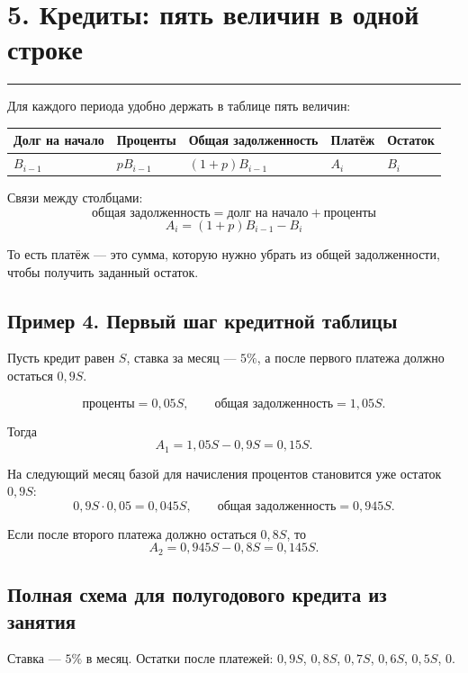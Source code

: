 \documentclass[a4paper,12pt]{article}
\newcommand{\sectionline}{\vspace{-0.4em}\textcolor{linegray}{\rule{\linewidth}{0.5pt}}\vspace{0.35em}}
\begin{document}
\section*{5. Кредиты: пять величин в одной строке}
\sectionline

Для каждого периода удобно держать в таблице пять величин:

\begin{center}
\begin{tabularx}{\linewidth}{>{\centering\arraybackslash}X >{\centering\arraybackslash}X >{\centering\arraybackslash}X >{\centering\arraybackslash}X >{\centering\arraybackslash}X}
\toprule
Долг на начало & Проценты & Общая задолженность & Платёж & Остаток \\
\midrule
$B_{i-1}$ & $pB_{i-1}$ & $(1+p)B_{i-1}$ & $A_i$ & $B_i$ \\
\bottomrule
\end{tabularx}
\end{center}

Связи между столбцами:
\[
\boxed{\text{общая задолженность}=\text{долг на начало}+\text{проценты}}
\]
\[
\boxed{A_i=(1+p)B_{i-1}-B_i}
\]

То есть платёж --- это сумма, которую нужно убрать из общей задолженности, чтобы получить заданный остаток.

\subsection*{Пример 4. Первый шаг кредитной таблицы}
Пусть кредит равен $S$, ставка за месяц --- $5\%$, а после первого платежа должно остаться $0{,}9S$.

\[
\text{проценты}=0{,}05S,
\qquad
\text{общая задолженность}=1{,}05S.
\]

Тогда
\[
A_1=1{,}05S-0{,}9S=0{,}15S.
\]

На следующий месяц базой для начисления процентов становится уже остаток $0{,}9S$:
\[
0{,}9S\cdot0{,}05=0{,}045S,
\qquad
\text{общая задолженность}=0{,}945S.
\]

Если после второго платежа должно остаться $0{,}8S$, то
\[
A_2=0{,}945S-0{,}8S=0{,}145S.
\]

\subsection*{Полная схема для полугодового кредита из занятия}
Ставка --- $5\%$ в месяц. Остатки после платежей: $0{,}9S$, $0{,}8S$, $0{,}7S$, $0{,}6S$, $0{,}5S$, $0$.
\end{document}
